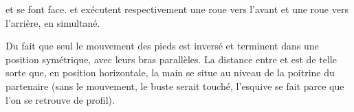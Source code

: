 \begin{exercice}
	\label{struc:ex:roue-deux}

	

	\A et \D se font face.
	\A et \D exécutent respectivement une roue vers l'avant et une roue vers l'arrière, en simultané.

	Du fait que seul le mouvement des pieds est inversé \A et \D terminent dans une position symétrique, avec leurs bras parallèles.
	La distance entre \A et \D est de telle sorte que, en position horizontale, la main se situe au niveau de la poitrine du partenaire (sans le mouvement, le buste serait touché, l'esquive se fait parce que l'on se retrouve de profil).

\end{exercice}



